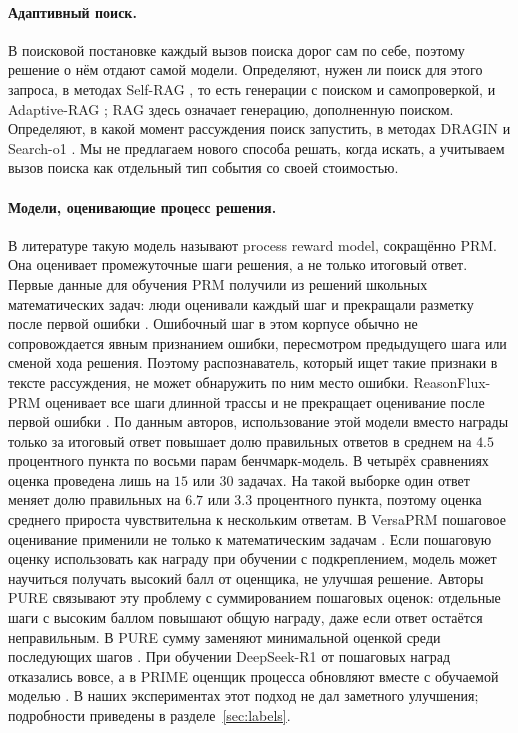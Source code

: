 \documentclass[11pt]{article}
\begin{document}
\paragraph{Адаптивный поиск.} В поисковой постановке каждый вызов поиска дорог сам по себе, поэтому решение о нём отдают самой модели. Определяют, нужен ли поиск для этого запроса, в методах Self-RAG \citep{asai2024selfrag}, то есть генерации с поиском и самопроверкой, и Adaptive-RAG \citep{jeong2024adaptiverag}; RAG здесь означает генерацию, дополненную поиском. Определяют, в какой момент рассуждения поиск запустить, в методах DRAGIN \citep{su2024dragin} и Search-o1 \citep{li2025searcho1}. Мы не предлагаем нового способа решать, когда искать, а учитываем вызов поиска как отдельный тип события со своей стоимостью.

\paragraph{Модели, оценивающие процесс решения.} В литературе такую модель называют process reward model, сокращённо PRM. Она оценивает промежуточные шаги решения, а не только итоговый ответ. Первые данные для обучения PRM получили из решений школьных математических задач: люди оценивали каждый шаг и прекращали разметку после первой ошибки \citep{lightman2024verify}. Ошибочный шаг в этом корпусе обычно не сопровождается явным признанием ошибки, пересмотром предыдущего шага или сменой хода решения. Поэтому распознаватель, который ищет такие признаки в тексте рассуждения, не может обнаружить по ним место ошибки. ReasonFlux-PRM оценивает все шаги длинной трассы и не прекращает оценивание после первой ошибки \citep{zou2025reasonflux}. По данным авторов, использование этой модели вместо награды только за итоговый ответ повышает долю правильных ответов в среднем на $4.5$ процентного пункта по восьми парам бенчмарк-модель. В четырёх сравнениях оценка проведена лишь на $15$ или $30$ задачах. На такой выборке один ответ меняет долю правильных на $6.7$ или $3.3$ процентного пункта, поэтому оценка среднего прироста чувствительна к нескольким ответам. В VersaPRM пошаговое оценивание применили не только к математическим задачам \citep{zeng2025versaprm}. Если пошаговую оценку использовать как награду при обучении с подкреплением, модель может научиться получать высокий балл от оценщика, не улучшая решение. Авторы PURE связывают эту проблему с суммированием пошаговых оценок: отдельные шаги с высоким баллом повышают общую награду, даже если ответ остаётся неправильным. В PURE сумму заменяют минимальной оценкой среди последующих шагов \citep{cheng2025pure}. При обучении DeepSeek-R1 \citep{deepseekr1} от пошаговых наград отказались вовсе, а в PRIME оценщик процесса обновляют вместе с обучаемой моделью \citep{cui2025prime}. В наших экспериментах этот подход не дал заметного улучшения; подробности приведены в разделе~\ref{sec:labels}.
\end{document}
